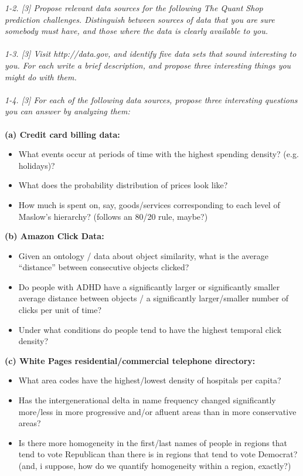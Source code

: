 \documentclass{article}[11pt]
\begin{document}
\bigskip
\textit{1-2. [3] Propose relevant data sources for the following The Quant Shop prediction
 challenges. Distinguish between sources of data that you are sure somebody must
 have, and those where the data is clearly available to you.}\\
  \\
 \textit{1-3. [3] Visit http://data.gov, and identify ﬁve data sets that sound interesting to
 you. For each write a brief description, and propose three interesting things you
 might do with them.}\\
  \\
 \textit{1-4. [3] For each of the following data sources, propose three interesting questions
 you can answer by analyzing them:}\\
  \\
 \textbf{(a) Credit card billing data:}
 \begin{itemize}
 	\item What events occur at periods of time with the highest spending density? (e.g. holidays)?
 	\item What does the probability distribution of prices look like?
 	\item How much is spent on, say, goods/services corresponding to each level of Maslow's hierarchy? (follows an 80/20 rule, maybe?)
 \end{itemize}
 \bigskip
 \textbf{(b) Amazon Click Data:}
 \begin{itemize}
 	\item Given an ontology / data about object similarity, what is the average ``distance'' between consecutive objects clicked?
 	\item Do people with ADHD have a significantly larger or significantly smaller average distance between objects / a significantly larger/smaller number of clicks per unit of time?
 	\item Under what conditions do people tend to have the highest temporal click density?
 \end{itemize}
 \bigskip
 \textbf{(c) White Pages residential/commercial telephone directory:}
 \begin{itemize}
 	\item What area codes have the highest/lowest density of hospitals per capita?
 	\item Has the intergenerational delta in name frequency changed significantly more/less in more progressive and/or afluent areas than in more conservative areas?
 	\item Is there more homogeneity in the first/last names of people in regions that tend to vote Republican than there is in regions that tend to vote Democrat? (and, i suppose, how do we quantify homogeneity within a region, exactly?)
 \end{itemize}
\end{document}
